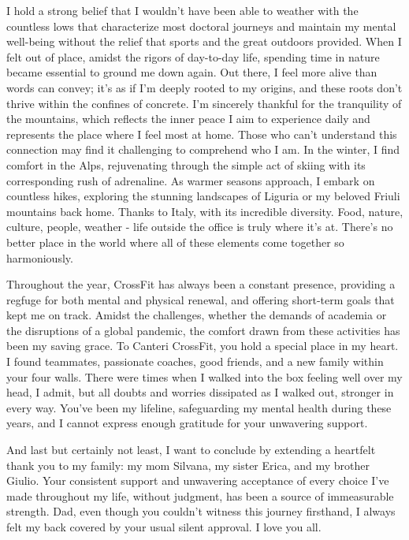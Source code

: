 \begin{addmargin}{-1.0cm}
I hold a strong belief that I wouldn't have been able to weather with the countless lows that characterize most doctoral journeys and maintain my mental well-being without the relief that sports and the great outdoors provided.
When I felt out of place, amidst the rigors of day-to-day life, spending time in nature became essential to ground me down again.
Out there, I feel more alive than words can convey; it's as if I'm deeply rooted to my origins, and these roots don't thrive within the confines of concrete. \linebreak
I'm sincerely thankful for the tranquility of the mountains, which reflects the inner peace I aim to experience daily and represents the place where I feel most at home.
Those who can't understand this connection may find it challenging to comprehend who I am. \linebreak
In the winter, I find comfort in the Alps, rejuvenating through the simple act of skiing with its corresponding rush of adrenaline.
As warmer seasons approach, I embark on countless hikes, exploring the stunning landscapes of Liguria or my beloved Friuli mountains back home.
Thanks to Italy, with its incredible diversity.
Food, nature, culture, people, weather - life outside the office is truly where it's at.
There's no better place in the world where all of these elements come together so harmoniously.

Throughout the year, CrossFit has always been a constant presence, providing a regfuge for both mental and physical renewal, and offering short-term goals that kept me on track.
Amidst the challenges, whether the demands of academia or the disruptions of a global pandemic, the comfort drawn from these activities has been my saving grace.
To Canteri CrossFit, you hold a special place in my heart.
I found teammates, passionate coaches, good friends, and a new family within your four walls.
There were times when I walked into the box feeling well over my head, I admit, but all doubts and worries dissipated as I walked out, stronger in every way.
You've been my lifeline, safeguarding my mental health during these years, and I cannot express enough gratitude for your unwavering support.

And last but certainly not least, I want to conclude by extending a heartfelt thank you to my family: my mom Silvana, my sister Erica, and my brother Giulio.
Your consistent support and unwavering acceptance of every choice I've made throughout my life, without judgment, has been a source of immeasurable strength.
Dad, even though you couldn't witness this journey firsthand, I always felt my back covered by your usual silent approval. I love you all.

\end{addmargin}

\vfill
\endgroup
